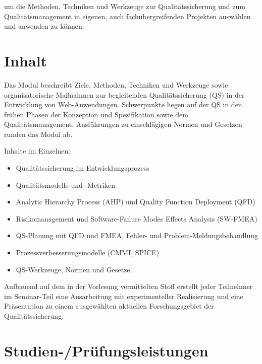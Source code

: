 um die Methoden, Techniken und Werkzeuge zur Qualitätssicherung und zum
Qualitätsmanagement in eigenen, auch fachübergreifenden Projekten
auswählen und anwenden zu können.

\section*{Inhalt\label{/mi-2017/modulbeschreibungen-master/MA_WTW_Modul_QUS_Winter}}\label{inhaltpathlabelmi-2017modulbeschreibungen-mastermaux5fwtwux5fmodulux5fqusux5fwinter}

Das Modul beschreibt Ziele, Methoden, Techniken und Werkzeuge sowie
organisatorische Maßnahmen zur begleitenden Qualitätssicherung (QS) in
der Entwicklung von Web-Anwendungen. Schwerpunkte liegen auf der QS in
den frühen Phasen der Konzeption und Spezifikation sowie dem
Qualitätsmanagement. Ausführungen zu einschlägigen Normen und Gesetzen
runden das Modul ab.

Inhalte im Einzelnen:

\begin{itemize}
\tightlist
\item
  Qualitätssicherung im Entwicklungsprozess
\item
  Qualitätsmodelle und -Metriken
\item
  Analytic Hierarchy Process (AHP) und Quality Function Deployment (QFD)
\item
  Risikomanagement und Software-Failure Modes Effects Analysis (SW-FMEA)
\item
  QS-Planung mit QFD und FMEA, Fehler- und Problem-Meldungsbehandlung
\item
  Prozessverbesserungsmodelle (CMMI, SPICE)
\item
  QS-Werkzeuge, Normen und Gesetze.
\end{itemize}

Aufbauend auf dem in der Vorlesung vermittelten Stoff erstellt jeder
Teilnehmer im Seminar-Teil eine Ausarbeitung mit experimenteller
Realisierung und eine Präsentation zu einem ausgewählten aktuellen
Forschungsgebiet der Qualitätssicherung.

\section*{Studien-/Prüfungsleistungen\label{/mi-2017/modulbeschreibungen-master/MA_WTW_Modul_QUS_Winter}}\label{studien-pruxfcfungsleistungenpathlabelmi-2017modulbeschreibungen-mastermaux5fwtwux5fmodulux5fqusux5fwinter}

